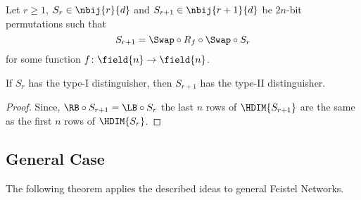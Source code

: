 \begin{lemma}
Let $r\ge 1$, $S_r \in \nbij{r}{d}$ and $S_{r+1} \in \nbij{r+1}{d}$ be $2n$-bit permutations such that
$$
S_{r+1} = \Swap \circ R_{f} \circ \Swap \circ S_r
$$
for some function $f\colon \field{n} \to \field{n}$.

If $S_{r}$ has the type-I distinguisher, then $S_{r+1}$ has the type-II distinguisher.
\end{lemma}
\begin{proof}
Since, $\RB \circ S_{r+1} = \LB \circ S_r$ the last $n$ rows of $\HDIM{S_{r+1}}$ are the same as the first $n$ rows of $\HDIM{S_r}$.
\end{proof}


\subsection{General Case}

The following theorem applies the described ideas to general Feistel Networks.

